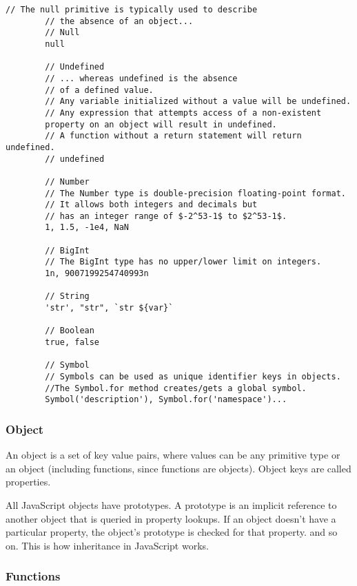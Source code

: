 \documentclass{scrartcl}
\begin{document}
    \begin{lstlisting}[style=ES6]
        // The null primitive is typically used to describe
        // the absence of an object...
        // Null
        null

        // Undefined
        // ... whereas undefined is the absence
        // of a defined value.
        // Any variable initialized without a value will be undefined.
        // Any expression that attempts access of a non-existent
        property on an object will result in undefined.
        // A function without a return statement will return undefined.
        // undefined

        // Number
        // The Number type is double-precision floating-point format.
        // It allows both integers and decimals but
        // has an integer range of $-2^53-1$ to $2^53-1$.
        1, 1.5, -1e4, NaN

        // BigInt
        // The BigInt type has no upper/lower limit on integers.
        1n, 9007199254740993n

        // String
        'str', "str", `str ${var}`

        // Boolean
        true, false

        // Symbol
        // Symbols can be used as unique identifier keys in objects.
        //The Symbol.for method creates/gets a global symbol.
        Symbol('description'), Symbol.for('namespace')...

    \end{lstlisting}

\subsubsection{Object}

    An object is a set of key value pairs, where values can be any primitive type or an object (including functions, since functions are objects). Object keys are called properties.

    All JavaScript objects have prototypes.
    A prototype is an implicit reference to another object that is queried in property lookups.
    If an object doesn't have a particular property, the object's prototype is checked for that property. and so on. This is how inheritance in JavaScript works.

\subsubsection{Functions}
\end{document}
